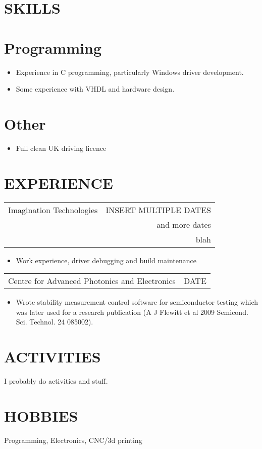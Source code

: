 \documentclass[margin]{res}
\begin{document}
\begin{resume}
\section{SKILLS} 

\normalsize{\section{Programming}}
	\begin{itemize} \itemsep -2pt
		\item Experience in C programming, particularly Windows driver development.
		\item Some experience with VHDL and hardware design.
	\end{itemize}

\normalsize{\section{Other}} 
                  \begin{itemize} \itemsep -2pt
                  \item Full clean UK driving licence 
                  \end{itemize} 
 
\section{EXPERIENCE}      
                  \begin{tabular}{p{3in} r} %
                  Imagination Technologies &  INSERT MULTIPLE DATES \\
                  & and more dates\\
                  & blah
                  \end{tabular}	
                   \begin{itemize} %
                    \item[] Work experience, driver debugging and build maintenance 
		   \end{itemize} 
		 \begin{tabular}{p{3in} r}
                  Centre for Advanced Photonics and Electronics & DATE
                 \end{tabular}	
		  \begin{itemize}
                   \item[] Wrote stability measurement control software for semiconductor testing which
                   was later used for a research publication (A J Flewitt et al 2009 Semicond. Sci. Technol. 24 085002).
                  \end{itemize}
                
\section{ACTIVITIES}
                I probably do activities and stuff.
 
\section{HOBBIES}         Programming, Electronics, CNC/3d printing 
 
\end{resume} 
\end{document}
